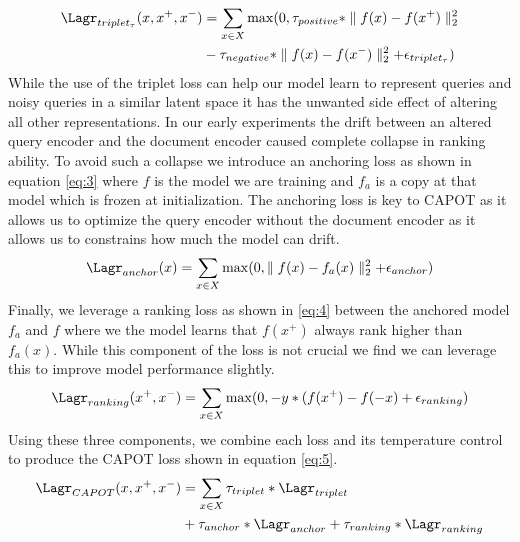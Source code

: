 \begin{equation} \label{eq:2} 
\begin{split}
    \Lagr_{triplet_\tau}(x, x^+, x^-) &= \sum_{x \in X} \max(0, \tau_{positive}*\mathrel{\Vert} f(x) - f(x^+) \mathrel{\Vert}_2^2 \\ 
    &- \tau_{negative}*\mathrel{\Vert} f(x) - f(x^-) \mathrel{\Vert}_2^2 + \epsilon_{triplet_{\tau}})
\end{split}
\end{equation}
While the use of the triplet loss can help our model learn to represent queries and noisy queries in a similar latent space it has the unwanted side effect of altering all other representations. In our early experiments the drift between an altered query encoder and the document encoder caused complete collapse in ranking ability. To avoid such a collapse we introduce an anchoring loss as shown in equation \ref{eq:3} where $f$ is the model we are training and $f_a$ is a copy at that model which is frozen at initialization. The anchoring loss is key to CAPOT as it allows us to optimize the query encoder without the document encoder as it allows us to constrains how much the model can drift.  \\
\begin{equation} \label{eq:3} 
    \Lagr_{anchor}(x) = \sum_{x \in X} \max(0,\mathrel{\Vert} f(x) - f_a(x) \mathrel{\Vert}_2^2 + \epsilon_{anchor})
\end{equation}
Finally, we leverage a ranking loss as shown in \ref{eq:4} between the anchored model $f_a$ and $f$ where we the model learns that $f(x^+)$ always rank higher than $f_a(x)$. While this component of the loss is not crucial we find we can leverage this to improve model performance slightly. \\

\begin{equation} \label{eq:4} 
    \Lagr_{ranking}(x^+, x^-) = \sum_{x \in X} \max(0,-y * (f(x^+)-f(-x) + \epsilon_{ranking})
\end{equation}
Using these three components, we combine each loss and its temperature control to produce the CAPOT loss shown in equation \ref{eq:5}.
\begin{equation} \label{eq:5} 
\begin{split}
    \Lagr_{CAPOT}(x, x^+, x^- ) &= \sum_{x \in X} \tau_{triplet} * \Lagr_{triplet} \\
    &+ \tau_{anchor} *  \Lagr_{anchor} + \tau_{ranking} * \Lagr_{ranking} 
\end{split}
\end{equation}
